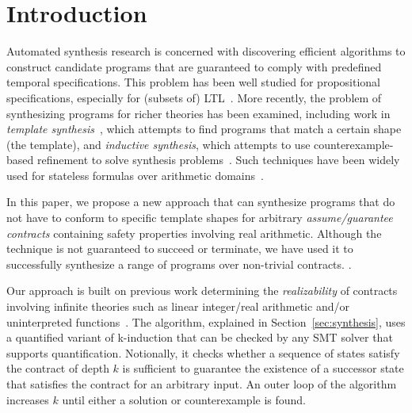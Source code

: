 \newcommand{\toolname}{RealSynth}


\section{Introduction}
Automated synthesis research is concerned with discovering efficient algorithms to construct candidate programs that are guaranteed to comply with predefined temporal specifications.  This problem has been well studied for propositional specifications, especially for (subsets of) LTL~\cite{gulwani2010dimensions}.  More recently, the problem of synthesizing programs for richer theories has been examined, including work in {\em template synthesis}~\cite{srivastava2013template}, which attempts to find programs that match a certain shape (the template), and {\em inductive synthesis}, which attempts to use counterexample-based refinement to solve synthesis problems~\cite{flener2001inductive}.  Such techniques have been widely used for stateless formulas over arithmetic domains~\cite{reynoldscounterexample}.  


In this paper, we propose a new approach that can synthesize programs that do
not have to conform to specific template shapes for arbitrary {\em
assume/guarantee contracts} containing safety properties involving real
arithmetic.  Although the technique is not guaranteed to succeed or terminate, we have used it to successfully synthesize a range of programs over non-trivial contracts.  .

Our approach is built on previous work determining the {\em realizability} of contracts involving infinite theories such as linear integer/real arithmetic and/or uninterpreted functions~\cite{Katis15:Realizability,katis2015machine}.  The algorithm, explained in Section~\ref{sec:synthesis}, uses a quantified variant of k-induction that can be checked by any SMT solver that supports quantification.  Notionally, it checks whether a sequence of states satisfy the contract of depth $k$ is sufficient to guarantee the existence of a successor state that satisfies the contract for an arbitrary input.  An outer loop of the algorithm increases $k$ until either a solution or counterexample is found.  

